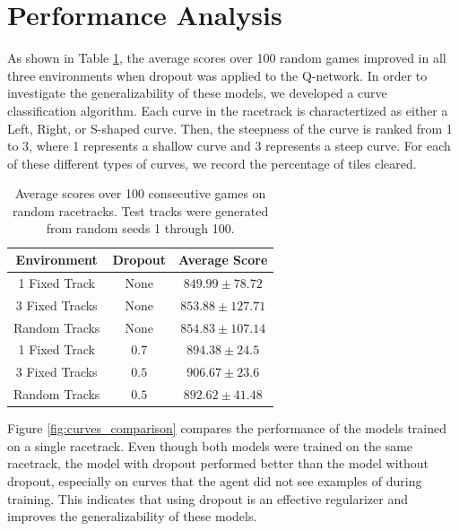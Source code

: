 \documentclass{article}
\begin{document}
\section{Performance Analysis}
As shown in Table \ref{tab:scores}, the average scores over 100 random games improved in all three environments when dropout was applied to the Q-network. In order to investigate the generalizability of these models, we developed a curve classification algorithm. Each curve in the racetrack is charactertized as either a Left, Right, or S-shaped curve. Then, the steepness of the curve is ranked from 1 to 3, where 1 represents a shallow curve and 3 represents a steep curve. For each of these different types of curves, we record the percentage of tiles cleared.  

\begin{table}[h!]
  \begin{center}
    \begin{tabular}{c|c|c}
      \textbf{Environment} & \textbf{Dropout} & \textbf{Average Score}\\
      \hline
      1 Fixed Track & None & $849.99\pm78.72$ \\
      3 Fixed Tracks & None & $853.88\pm127.71$ \\
      Random Tracks & None & $854.83\pm107.14$ \\
      1 Fixed Track & $0.7$ & $894.38\pm24.5$ \\
      3 Fixed Tracks & $0.5$ & $906.67\pm23.6$ \\
      Random Tracks & $0.5$ & $892.62\pm41.48$ \\
    \end{tabular}
    \vspace{0.1cm}
    \caption{Average scores over 100 consecutive games on random racetracks. Test tracks were generated from random seeds 1 through 100. }
    \label{tab:scores}
  \end{center}
\end{table}
\vspace{-5mm}

Figure \ref{fig:curves_comparison} compares the performance of the models trained on a single racetrack. Even though both models were trained on the same racetrack, the model with dropout performed better than the model without dropout, especially on curves that the agent did not see examples of during training. This indicates that using dropout is an effective regularizer and improves the generalizability of these models.
\end{document}
